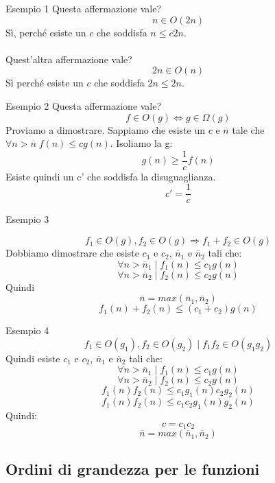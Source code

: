 \documentclass[a4paper]{article}
\begin{document}
\begin{examplebox}{Esempio 1}
Questa affermazione vale?
\[n \in O(2n)\]
Sì, perché esiste un $c$ che soddisfa $n \le c2n$.\\\\
Quest'altra affermazione vale?
\[2n \in O(n)\]
Sì perché esiste un $c$ che soddisfa $2n \le 2n$.
\end{examplebox}
\begin{examplebox}{Esempio 2}
Questa affermazione vale?
\[f \in O(g) \Longleftrightarrow g \in \Omega(g)\]
Proviamo a dimostrare. Sappiamo che esiste un $c$ e $\overline{n}$ tale che \(\forall n > \overline{n} \; f(n) \le cg(n)\). Isoliamo la g:
\[g(n) \ge \frac{1}{c} f(n)\]
Esiste quindi un c' che soddisfa la disuguaglianza.
\[c' = \frac{1}{c}\]
\end{examplebox}
\begin{examplebox}{Esempio 3}

\[f_1 \in O(g),
f_2 \in O(g) \Longrightarrow f_1 + f_2 \in O(g)
\]
Dobbiamo dimostrare che esiste $c_1$ e $c_2$, $\overline{n}_1$ e $\overline{n}_2$ tali che:
\[\forall n > \overline{n}_1 \; | \; f_1(n) \le c_1g(n)\]
\[\forall n > \overline{n}_2 \; | \; f_2(n) \le c_2g(n)\]
Quindi
\[\overline{n} = max(\overline{n}_1, \overline{n}_2)\]
\[f_1(n) + f_2(n) \le (c_1 + c_2)g(n)\]

\end{examplebox}

\begin{examplebox}{Esempio 4}
    \[f_1 \in O(g_1), f_2 \in O(g_2) \; | \; f_1f_2 \in O(g_1g_2)\]
Quindi esiste $c_1$ e $c_2$, $\overline{n}_1$ e $\overline{n}_2$ tali che:
\[\forall n > \overline{n}_1 \; | \; f_1(n) \le c_1g(n)\]
\[\forall n > \overline{n}_2 \; | \; f_2(n) \le c_2g(n)\]
\[f_1(n)f_2(n) \le c_1g_1(n)c_2g_2(n)\]
\[f_1(n)f_2(n) \le c_1c_2g_1(n)g_2(n)\]
Quindi:
 \[c = c_1c_2\] \[\overline{n} = max(\overline{n}_1, \overline{n}_2)\]
\end{examplebox}

\subsection{Ordini di grandezza per le funzioni}
\end{document}
